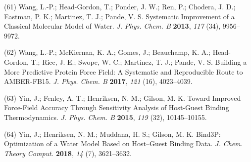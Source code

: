 \documentclass[11pt,notitlepage]{article}
\begin{document}
\leavevmode\hypertarget{ref-50lAQZra}{}%
(61) Wang, L.-P.; Head-Gordon, T.; Ponder, J. W.; Ren, P.; Chodera, J.
D.; Eastman, P. K.; Martinez, T. J.; Pande, V. S. Systematic Improvement
of a Classical Molecular Model of Water. \emph{J. Phys. Chem. B}
\textbf{2013}, \emph{117} (34), 9956--9972.

\leavevmode\hypertarget{ref-1E3wArY0j}{}%
(62) Wang, L.-P.; McKiernan, K. A.; Gomes, J.; Beauchamp, K. A.;
Head-Gordon, T.; Rice, J. E.; Swope, W. C.; Martínez, T. J.; Pande, V.
S. Building a More Predictive Protein Force Field: A Systematic and
Reproducible Route to AMBER-FB15. \emph{J. Phys. Chem. B} \textbf{2017},
\emph{121} (16), 4023--4039.

\leavevmode\hypertarget{ref-xRauI5mb}{}%
(63) Yin, J.; Fenley, A. T.; Henriksen, N. M.; Gilson, M. K. Toward
Improved Force-Field Accuracy Through Sensitivity Analysis of Host-Guest
Binding Thermodynamics. \emph{J. Phys. Chem. B} \textbf{2015},
\emph{119} (32), 10145--10155.

\leavevmode\hypertarget{ref-NeqIQDLp}{}%
(64) Yin, J.; Henriksen, N. M.; Muddana, H. S.; Gilson, M. K. Bind3P:
Optimization of a Water Model Based on Host--Guest Binding Data.
\emph{J. Chem. Theory Comput.} \textbf{2018}, \emph{14} (7), 3621--3632.
\end{document}
